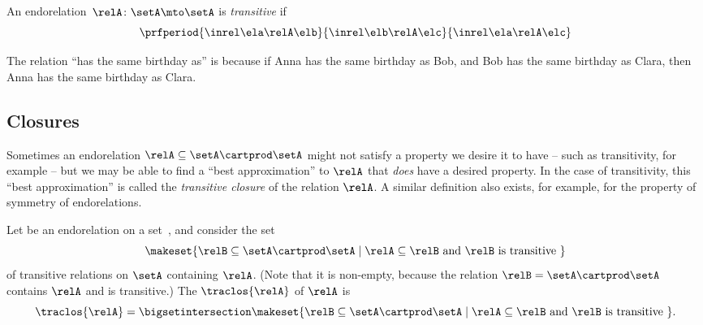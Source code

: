 \begin{ctdefinition}[Transitive]
    \label{def:transitive-relation}
    An endorelation~$\relA\colon \setA\mto \setA$ is \emph{transitive} if
    \begin{equation}\label{eq:transitive}
        \prfperiod{
            \inrel \ela \relA \elb
        }{
            \inrel \elb \relA \elc
        }{
            \inrel \ela \relA \elc
        }
    \end{equation}
\end{ctdefinition}

\begin{example}
    The relation ``has the same birthday as'' is  because if Anna has the same birthday as Bob, and Bob has the same birthday as Clara, then Anna has the same birthday as Clara.
\end{example}


\subsection{Closures}

Sometimes an endorelation $\relA \subseteq \setA \cartprod \setA$ might not satisfy a property we desire it to have -- such as transitivity, for example -- but we may be able to find a ``best approximation'' to $\relA$ that \emph{does} have a desired property. In the case of transitivity, this ``best approximation'' is called the \emph{transitive closure} of the relation $\relA$. A similar definition also exists, for example, for the property of symmetry of endorelations. 

\begin{ctdefinition}
    \label{def:transitive-closure}
    Let \relA be an endorelation on a set~\setA, and consider the set
    \begin{equation}
\makeset{ \relB \subseteq \setA \cartprod \setA \mid \relA \subseteq \relB \text{ and } \relB \text{ is transitive } } 
\end{equation}
of transitive relations on $\setA$ containing $\relA$. (Note that it is non-empty, because the relation $\relB = \setA \cartprod \setA$ contains $\relA$ and is transitive.) The  $\traclos{\relA}$ of $\relA$ is
\begin{equation}
\traclos{\relA} = \bigsetintersection \makeset{ \relB \subseteq \setA \cartprod \setA \mid \relA \subseteq \relB \text{ and } \relB \text{ is transitive } }. 
\end{equation}
\end{ctdefinition}


